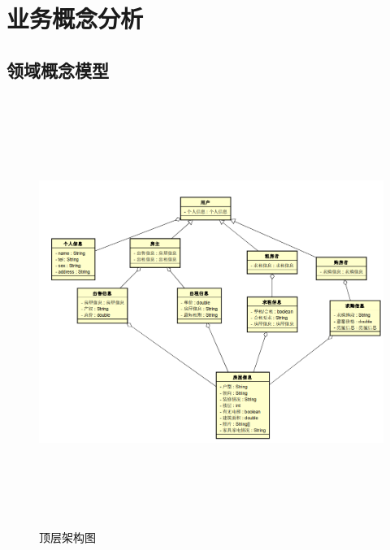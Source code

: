 
\chapter{业务概念分析}

\section{领域概念模型}

\begin{figure}[htbp]

    \centering
    
    \includegraphics[height=14.0cm,width=14.0cm]{requirement/figures/lingyu.png}%
    
    \caption{顶层架构图}
    
    \end{figure}
